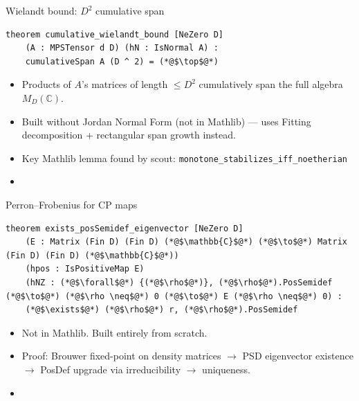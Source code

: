 \documentclass[aspectratio=169,10pt]{beamer}
\begin{document}
\begin{frame}[fragile]{Wielandt bound: $D^2$ cumulative span}
    \vspace{-0.4em}
\begin{lstlisting}
theorem cumulative_wielandt_bound [NeZero D]
    (A : MPSTensor d D) (hN : IsNormal A) :
    cumulativeSpan A (D ^ 2) = (*@$\top$@*)
\end{lstlisting}
    \vspace{0.3em}
    \begin{itemize}
        \item Products of $A$'s matrices of length $\le D^2$ cumulatively span the full algebra $M_D(\mathbb{C})$.
        \item Built without Jordan Normal Form (not in Mathlib) --- uses Fitting decomposition + rectangular span growth instead.
        \item Key Mathlib lemma found by scout: \texttt{monotone\_stabilizes\_iff\_noetherian}
        \item {}
    \end{itemize}
\end{frame}

\begin{frame}[fragile]{Perron--Frobenius for CP maps}
    \vspace{-0.4em}
\begin{lstlisting}
theorem exists_posSemidef_eigenvector [NeZero D]
    (E : Matrix (Fin D) (Fin D) (*@$\mathbb{C}$@*) (*@$\to$@*) Matrix (Fin D) (Fin D) (*@$\mathbb{C}$@*))
    (hpos : IsPositiveMap E)
    (hNZ : (*@$\forall$@*) {(*@$\rho$@*)}, (*@$\rho$@*).PosSemidef (*@$\to$@*) (*@$\rho \neq$@*) 0 (*@$\to$@*) E (*@$\rho \neq$@*) 0) :
    (*@$\exists$@*) (*@$\rho$@*) r, (*@$\rho$@*).PosSemidef
\end{lstlisting}
    \vspace{0.3em}
    \begin{itemize}
        \item Not in Mathlib. Built entirely from scratch.
        \item Proof: Brouwer fixed-point on density matrices $\to$ PSD eigenvector existence $\to$ PosDef upgrade via irreducibility $\to$ uniqueness.
        \item {}
    \end{itemize}
\end{frame}
\end{document}
